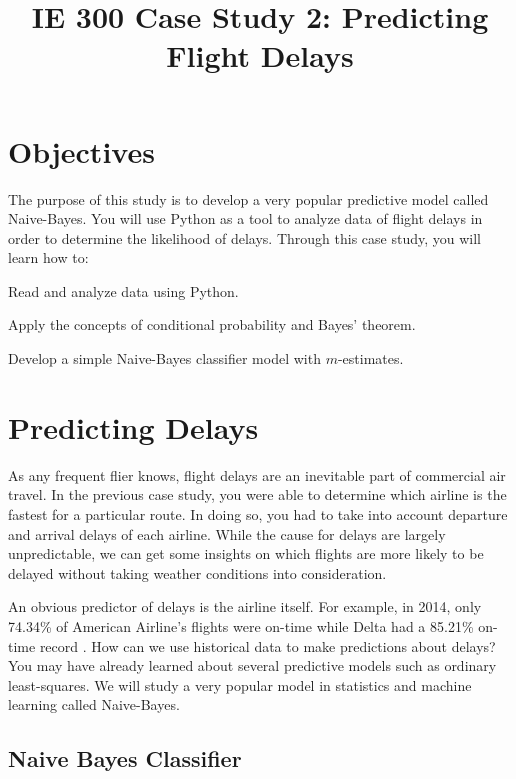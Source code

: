 \documentclass[11pt]{article}
\title{IE 300 Case Study 2: Predicting Flight Delays}
\author{\empty}
\date{\empty}
\begin{document}
\maketitle
\setlength{\parskip}{0.1em}

\section{Objectives}

The purpose of this study is to develop a very popular predictive model called Naive-Bayes.
You will use Python as a tool to analyze data of flight delays in order to determine the likelihood of delays.
Through this case study, you will learn how to:
\begin{tightenum}
\item Read and analyze data using Python.
\item Apply the concepts of conditional probability and Bayes' theorem.
\item Develop a simple Naive-Bayes classifier model with $m$-estimates.
\end{tightenum}

\section{Predicting Delays}

As any frequent flier knows, flight delays are an inevitable part of commercial air travel.
In the previous case study, you were able to determine which airline is the fastest for a particular route.
In doing so, you had to take into account departure and arrival delays of each airline.
While the cause for delays are largely unpredictable, we can get some insights on
which flights are more likely to be delayed without taking weather conditions into consideration.

An obvious predictor of delays is the airline itself.
For example, in 2014, only 74.34\% of American Airline’s flights were on-time
while Delta had a 85.21\% on-time record \cite{skift2014worlds}.
How can we use historical data to make predictions about delays?
You may have already learned about several predictive models such as ordinary least-squares.
We will study a very popular model in statistics and machine learning called Naive-Bayes.

\subsection{Naive Bayes Classifier}
\end{document}
